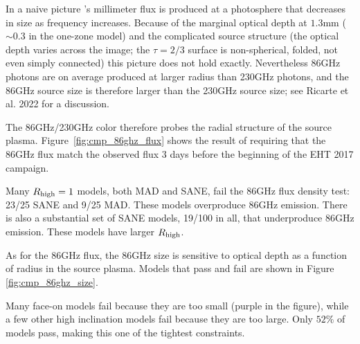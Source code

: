 

In a naive picture \sgra's millimeter flux is produced at a photosphere that decreases in size as frequency increases.  Because of the marginal optical depth at $1.3$mm ($\sim 0.3$ in the one-zone model) and the complicated source structure (the optical depth varies across the image; the $\tau = 2/3$ surface is non-spherical, folded, not even simply connected) this picture does not hold exactly.  Nevertheless 86GHz photons are on average produced at larger radius than 230GHz photons, and the 86GHz source size is therefore larger than the 230GHz source size; see Ricarte et al. 2022 for a discussion.

The 86GHz/230GHz color therefore probes the radial structure of the source plasma.  Figure~\ref{fig:cmp_86ghz_flux} shows the result of requiring that the 86GHz flux match the observed flux 3 days before the beginning of the EHT 2017 campaign.

Many $R_\mathrm{high} = 1$ models, both MAD and SANE, fail the $86$GHz flux density test: 23/25 SANE and 9/25 MAD.  These models overproduce $86$GHz emission.
There is also a substantial set of SANE models, 19/100 in all, that underproduce $86$GHz emission.  These models have larger $R_\mathrm{high}$.



As for the $86$GHz flux, the $86$GHz size is sensitive to optical depth as a function of radius in the source plasma. Models that pass and fail are shown in Figure \ref{fig:cmp_86ghz_size}.

Many face-on models fail because they are too small (purple in the figure), while a few other high inclination models fail because they are too large.  Only $52\%$ of models pass, making this one of the tightest constraints.

